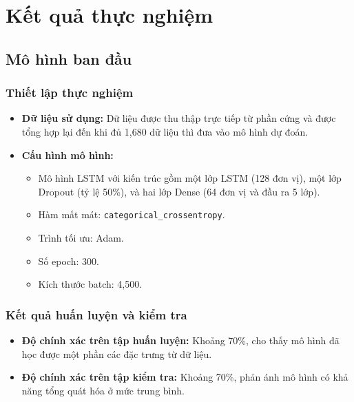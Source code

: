 \section{Kết quả thực nghiệm}
\subsection{Mô hình ban đầu}

\subsubsection{Thiết lập thực nghiệm}
\begin{itemize}
    \item \textbf{Dữ liệu sử dụng:} Dữ liệu được thu thập trực tiếp từ phần cứng và được tổng hợp lại đến khi đủ 1,680 dữ liệu thì đưa vào mô hình dự đoán.
    \item \textbf{Cấu hình mô hình:}
    \begin{itemize}
        \item Mô hình LSTM với kiến trúc gồm một lớp LSTM (128 đơn vị), một lớp Dropout (tỷ lệ 50\%), và hai lớp Dense (64 đơn vị và đầu ra 5 lớp).
        \item Hàm mất mát: \texttt{categorical\_crossentropy}.
        \item Trình tối ưu: Adam.
        \item Số epoch: 300.
        \item Kích thước batch: 4,500.
    \end{itemize}
\end{itemize}

\subsubsection{Kết quả huấn luyện và kiểm tra}
\begin{itemize}
    \item \textbf{Độ chính xác trên tập huấn luyện:} Khoảng 70\%, cho thấy mô hình đã học được một phần các đặc trưng từ dữ liệu.
    \item \textbf{Độ chính xác trên tập kiểm tra:} Khoảng 70\%, phản ánh mô hình có khả năng tổng quát hóa ở mức trung bình.
\end{itemize}

